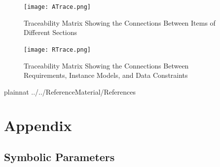 \documentclass[12pt]{article}
\begin{document}
\begin{figure}[h!]
	\begin{center}
		{
			\texttt{[image: ATrace.png]}
		}
		\caption{\label{Fig_ATrace} Traceability Matrix Showing the Connections Between Items of Different Sections}
	\end{center}
\end{figure}


\begin{figure}[h!]
	\begin{center}
		{
			\texttt{[image: RTrace.png]}
		}
		\caption{\label{Fig_RTrace} Traceability Matrix Showing the Connections Between Requirements, Instance Models, and Data Constraints}
	\end{center}
\end{figure}



\newpage

 {plainnat}
 {../../ReferenceMaterial/References}

\newpage

\section{Appendix}


\subsection{Symbolic Parameters}

\end{document}

